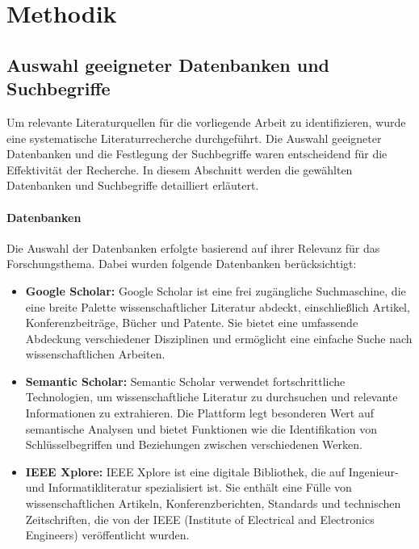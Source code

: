 \section{Methodik}

\subsection{Auswahl geeigneter Datenbanken und Suchbegriffe}

Um relevante Literaturquellen für die vorliegende Arbeit zu identifizieren, wurde eine systematische Literaturrecherche durchgeführt. Die Auswahl geeigneter Datenbanken und die Festlegung der Suchbegriffe waren entscheidend für die Effektivität der Recherche. In diesem Abschnitt werden die gewählten Datenbanken und Suchbegriffe detailliert erläutert.

\paragraph{Datenbanken}

Die Auswahl der Datenbanken erfolgte basierend auf ihrer Relevanz für das Forschungsthema. Dabei wurden folgende Datenbanken berücksichtigt:

\begin{itemize}
    \item \textbf{Google Scholar:} Google Scholar ist eine frei zugängliche Suchmaschine, die eine breite Palette wissenschaftlicher Literatur abdeckt, einschließlich Artikel, Konferenzbeiträge, Bücher und Patente. Sie bietet eine umfassende Abdeckung verschiedener Disziplinen und ermöglicht eine einfache Suche nach wissenschaftlichen Arbeiten.

    \item \textbf{Semantic Scholar:} Semantic Scholar verwendet fortschrittliche Technologien, um wissenschaftliche Literatur zu durchsuchen und relevante Informationen zu extrahieren. Die Plattform legt besonderen Wert auf semantische Analysen und bietet Funktionen wie die Identifikation von Schlüsselbegriffen und Beziehungen zwischen verschiedenen Werken.

    \item \textbf{IEEE Xplore:} IEEE Xplore ist eine digitale Bibliothek, die auf Ingenieur- und Informatikliteratur spezialisiert ist. Sie enthält eine Fülle von wissenschaftlichen Artikeln, Konferenzberichten, Standards und technischen Zeitschriften, die von der IEEE (Institute of Electrical and Electronics Engineers) veröffentlicht wurden.
\end{itemize}

